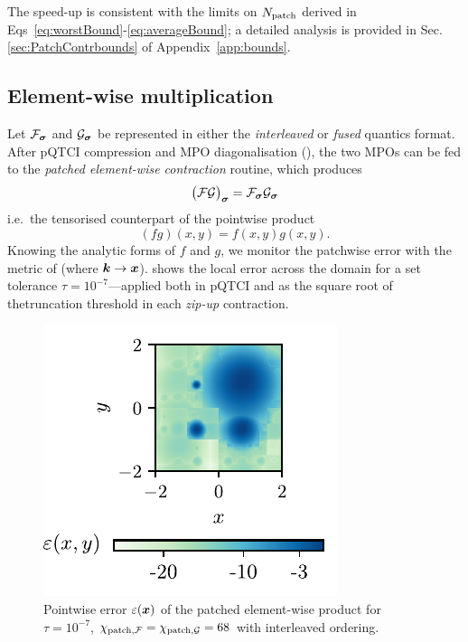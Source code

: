The speed-up is consistent with the limits on $N_{\text{patch}}$ derived in Eqs~\eqref{eq:worstBound}-\eqref{eq:averageBound}; a detailed analysis is provided in Sec.\ref{sec:PatchContrbounds} of Appendix~\ref{app:bounds}.


\subsection{Element-wise multiplication}

Let \(\mathcal{F}_{\boldsymbol{\sigma}}\) and \(\mathcal{G}_{\boldsymbol{\sigma}}\) be represented in either the
\emph{interleaved} or \emph{fused} quantics format.  
After pQTCI compression and MPO diagonalisation
(), the two MPOs can be fed to the \emph{patched
element-wise contraction} routine, which produces
\begin{equation}
 \bigl(\mathcal{F}\mathcal{G}\bigr)_{\boldsymbol{\sigma}} = \mathcal{F}_{\boldsymbol{\sigma}}\mathcal{G}_{\boldsymbol{\sigma}}
\end{equation} 
i.e.\ the tensorised counterpart of the pointwise product 
\begin{equation}
    (fg)(x,y) = f(x,y)g(x,y).
\end{equation}
Knowing the analytic forms of \(f\) and \(g\), we monitor the patchwise error with the metric of  (where $\boldsymbol{k} \to \boldsymbol{x}$).  
 shows the local error across the domain for a set tolerance \(\tau=10^{-7}\)—applied both in pQTCI and as the square root of thetruncation threshold in each \emph{zip-up} contraction.

\begin{figure}[htpb]
    \centering
    \includegraphics{figures/elemMulError.pdf}
    \caption{Pointwise error \(\varepsilon(\boldsymbol{x})\) of the patched element-wise product for \(\tau=10^{-7}\), $\chi_{\text{patch},\mathcal{F}} = \chi_{\text{patch},\mathcal{G}} = 68$ with interleaved ordering.}
    \label{fig:localErrorElemmul}
\end{figure}



